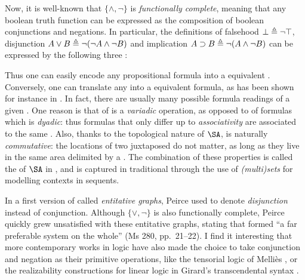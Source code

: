 \AP
Now, it is well-known that $\{\land,\neg\}$ is \emph{functionally complete},
meaning that any boolean truth function can be expressed as the composition of
boolean conjunctions and negations. In particular, the  definitions of
falsehood $\bot \triangleq \neg\top$,  disjunction $A \lor B \triangleq
\neg(\neg A \land \neg B)$ and  implication $A \supset B \triangleq \neg (A
\land \neg B)$ can be expressed by the following three :
Thus one can easily encode any propositional formula into a 
equivalent . Conversely, one can translate any  into a
 equivalent formula, as has been shown for instance in
. In fact, there are usually many
possible formula readings of a given . One reason is that
 of  is a \emph{variadic} operation, as opposed to
 of formulas which is \emph{dyadic}: thus formulas that only
differ up to \emph{associativity} are associated to the same . Also,
thanks to the topological nature of $\SA$,  is naturally
\emph{commutative}: the locations of two juxtaposed  do not matter,
as long as they live in the same area delimited by a . The combination
of these properties is called the  of $\SA$ in
, and is captured in traditional 
through the use of \emph{(multi)sets} for modelling contexts in sequents.

\begin{remark}
  
  In a first version of  called \emph{entitative graphs}, Peirce used
   to denote \emph{disjunction} instead of conjunction.
  Although $\{\lor,\neg\}$ is also functionally complete, Peirce quickly grew
  unsatisfied with these entitative graphs, stating that  formed ``a far
  preferable system on the whole'' (Ms 280, pp.~21--22). I find it interesting
  that more contemporary works in logic have also made the choice to take
  conjunction and negation as their primitive operations, like the tensorial
  logic of Melliès \cite{mellies_micrological_2017}, or the realizability
  constructions for linear logic in Girard's transcendental syntax
  \cite{eng_stellar_2020}.
\end{remark}

